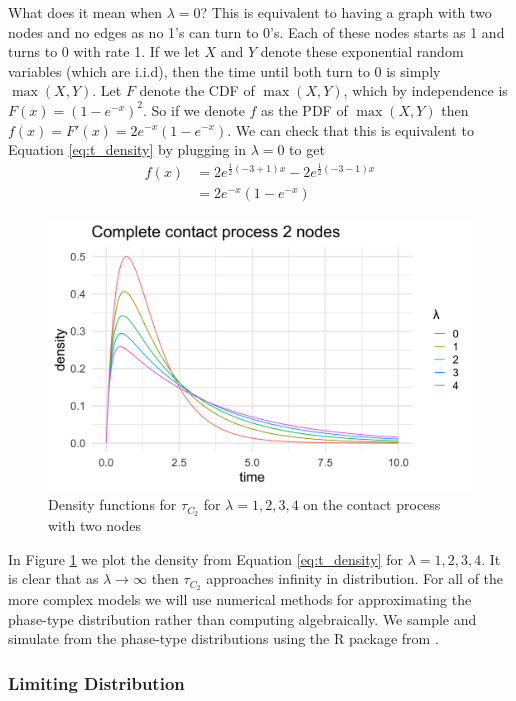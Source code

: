 What does it mean when $\lambda = 0$? This is equivalent to having a graph with two nodes and no edges as no 1's can turn to 0's.
Each of these nodes starts as 1 and turns to 0 with rate 1.
If we let $X$ and $Y$ denote these exponential random variables (which are i.i.d), then  the time until both turn to 0 is simply $\max(X,Y)$.
Let $F$ denote the CDF of $\max(X,Y)$, which by independence is $F(x) = (1 - e^{-x})^2$.
So if we denote $f$ as the PDF of $\max(X,Y)$ then $f(x) = F'(x) = 2e^{-x}(1 - e^{-x})$.
We can check that this is equivalent to Equation \eqref{eq:t_density} by plugging in $\lambda = 0$ to get
\begin{align*}
f(x) &= 2 e^{\frac{1}{2}(-3 + 1)x} - 2e^{\frac{1}{2}(-3 - 1)x}\\
&= 2 e^{-x}(1 - e^{-x})
\end{align*}


\begin{figure}[H]
  \centering
    \includegraphics[width=.80\textwidth]{figures/complete_2_contact_phase_densities.png}
   \caption{Density functions for $\tau_{C_2}$ for $\lambda = 1, 2, 3, 4$ on the contact process with two nodes}
  \label{fig:contact_2_phase_densities}
\end{figure}

In Figure \ref{fig:contact_2_phase_densities} we plot the density from Equation \ref{eq:t_density} for $\lambda = 1, 2, 3, 4$.
It is clear that as $\lambda \to \infty$ then $\tau_{C_2}$ approaches infinity in distribution.
For all of the more complex models we will use numerical methods for approximating the phase-type distribution rather than computing algebraically.
We sample and simulate from the phase-type distributions using the R package from \cite{actuar2008}.

\subsubsection{Limiting Distribution}

